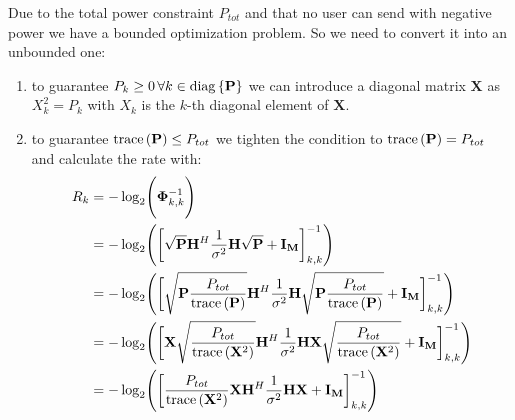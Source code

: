 Due to the total power constraint $P_{tot}$ and that no user can send with negative power we have a bounded optimization problem. So we need to convert it into an unbounded one:
\begin{enumerate}
 	\item to guarantee $P_k \geq 0 \, \forall k\in\mathrm{diag}\left\lbrace\mathbf{P}\right\rbrace$ we can introduce a diagonal matrix $\mathbf{X}$ as $X_k^2 = P_k$ with $X_k$ is the $k$-th diagonal element of $\mathbf{X}$.
 	\item to guarantee $\text{trace}\left(\mathbf{P}\right)\leq P_{tot}$ we tighten the condition to $\text{trace}\left(\mathbf{P}\right)= P_{tot}$ and calculate the rate with:
 	\begin{align}
	R_k &= -\log_2\Biggr(\mathbf{\Phi}_{k,k}^{-1}\Biggl)\\
	&= -\log_2\Biggr(\biggr[ \sqrt{\mathbf{P}}\mathbf{H}^H\frac{1}{\sigma^2}\mathbf{H}\sqrt{\mathbf{P}} + \mathbf{I_M} \biggl]_{k,k}^{-1}\Biggl)\\
	&= -\log_2\Biggr(\biggr[ \sqrt{\mathbf{P} \frac{P_{tot}}{\text{trace}\left(\mathbf{P}\right)}}\mathbf{H}^H\frac{1}{\sigma^2}\mathbf{H} \sqrt{\mathbf{P} \frac{P_{tot}}{\text{trace}\left(\mathbf{P}\right)}} + \mathbf{I_M} \biggl]_{k,k}^{-1}\Biggl)\\
	&= -\log_2\Biggr(\biggr[ \mathbf{X} \sqrt{\frac{P_{tot}}{\text{trace}\left(\mathbf{X}^2\right)}} \mathbf{H}^H\frac{1}{\sigma^2}\mathbf{H} \mathbf{X} \sqrt{\frac{P_{tot}}{\text{trace}\left(\mathbf{X}^2\right)}} + \mathbf{I_M} \biggl]_{k,k}^{-1}\Biggl)\\
	&= -\log_2\Biggr(\biggr[\frac{P_{tot}}{\text{trace}\left(\mathbf{X}^2\right)} \mathbf{X}\mathbf{H}^H\frac{1}{\sigma^2}\mathbf{H} \mathbf{X} + \mathbf{I_M} \biggl]_{k,k}^{-1}\Biggl)
\end{align}
\end{enumerate}

